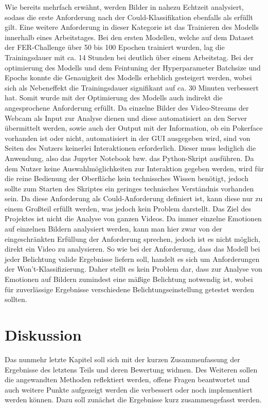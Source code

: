 \documentclass[12pt, a4paper]{report}
\begin{document}
Wie bereits mehrfach erwähnt, werden Bilder in nahezu Echtzeit analysiert, sodass die erste Anforderung nach der Could-Klassifikation ebenfalls als erfüllt gilt.
Eine weitere Anforderung in dieser Kategorie ist das Trainieren des Modells innerhalb eines Arbeitstages. Bei den ersten Modellen, welche auf dem Dataset der FER-Challenge über 50 bis 100 Epochen trainiert wurden, lag die Trainingsdauer mit ca. 14 Stunden bei deutlich über einem Arbeitstag. Bei der optimierung des Modells und dem Feintuning der Hyperparameter Batchsize und Epochs konnte die Genauigkeit des Modells erheblich gesteigert werden, wobei sich als Nebeneffekt die Trainingsdauer signifikant auf ca. 30 Minuten verbessert hat. Somit wurde mit der Optimierung des Modells auch indirekt die angesprochene Anforderung erfüllt. Da einzelne Bilder des Video-Streams der Webcam als Input zur Analyse dienen und diese automatisiert an den Server übermittelt werden, sowie auch der Output mit der Information, ob ein Pokerface vorhanden ist oder nicht, automatisiert in der GUI ausgegeben wird, sind von Seiten des Nutzers keinerlei Interaktionen erforderlich. Dieser muss lediglich die Anwendung, also das Jupyter Notebook bzw. das Python-Skript ausführen. Da dem Nutzer keine Auswahlmöglichkeiten zur Interaktion gegeben werden, wird für die reine Bedienung der Oberfläche kein technissches Wissen benötigt, jedoch sollte zum Starten des Skriptes ein geringes technisches Verständnis vorhanden sein. Da diese Anforderung als Could-Anforderung definiert ist, kann diese nur zu einem Großteil erfüllt werden, was jedoch kein Problem darstellt.\newline
Das Ziel des Projektes ist nicht die Analyse von ganzen Videos. Da immer einzelne Emotionen auf einzelnen Bildern analysiert werden, kann man hier zwar von der eingeschränkten Erfüllung der Anforderung sprechen, jedoch ist es nicht möglich, direkt ein Video zu analysieren. So wie bei der Anforderung, dass das Modell bei jeder Belichtung valide Ergebnisse liefern soll, handelt es sich um Anforderungen der Won't-Klassifizierung. Daher stellt es kein Problem dar, dass zur Analyse von Emotionen auf Bildern zumindest eine mäßige Belichtung notwendig ist, wobei für zuverlässige Ergebnisse verschiedene Belichtungseinstellung getestet werden sollten.

\let\cleardoublepage\relax
\chapter{Diskussion}
Das nunmehr letzte Kapitel soll sich mit der kurzen Zusammenfassung der Ergebnisse des letztens Teils und deren Bewertung widmen. 
Des Weiteren sollen die angewandten Methoden reflektiert werden,
offene Fragen beantwortet und auch weitere Punkte aufgezeigt werden die verbessert oder noch implementiert werden können. Dazu soll zunächst die Ergebnisse kurz zusammengefasst werden.
\end{document}
